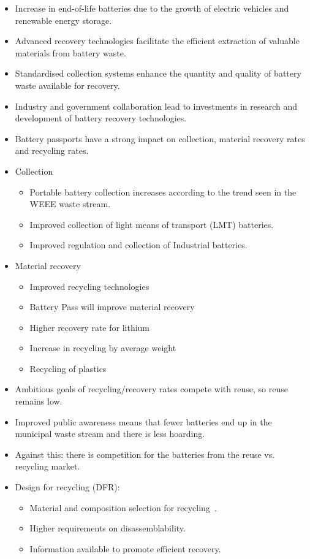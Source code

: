 \begin{itemize}
  \item Increase in end-of-life batteries due to the growth of electric vehicles and renewable energy storage.
  \item Advanced recovery technologies facilitate the efficient extraction of valuable materials from battery waste.
  \item Standardised collection systems enhance the quantity and quality of battery waste available for recovery.
  \item Industry and government collaboration lead to investments in research and development of battery recovery technologies.
  \item Battery passports have a strong impact on collection, material recovery rates and recycling rates.
  \item Collection
        \begin{itemize}
          \item Portable battery collection increases according to the trend seen in the WEEE waste stream.
          \item Improved collection of light means of transport (LMT) batteries.
          \item Improved regulation and collection of Industrial batteries.
        \end{itemize}
  \item Material recovery
        \begin{itemize}
          \item Improved recycling technologies
          \item Battery Pass will improve material recovery
          \item Higher recovery rate for lithium
          \item Increase in recycling by average weight
          \item Recycling of plastics
        \end{itemize}
  \item Ambitious goals of recycling/recovery rates compete with reuse, so reuse remains low.
  \item Improved public awareness means that fewer batteries end up in the municipal waste stream and there is less hoarding.
  \item Against this: there is competition for the batteries from the reuse vs. recycling market.
  \item Design for recycling (DFR):
        \begin{itemize}
          \item Material and composition selection for recycling~\cite{helander2023battelv}.
          \item Higher requirements on disassemblability.
          \item Information available to promote efficient recovery.
        \end{itemize}
\end{itemize}




